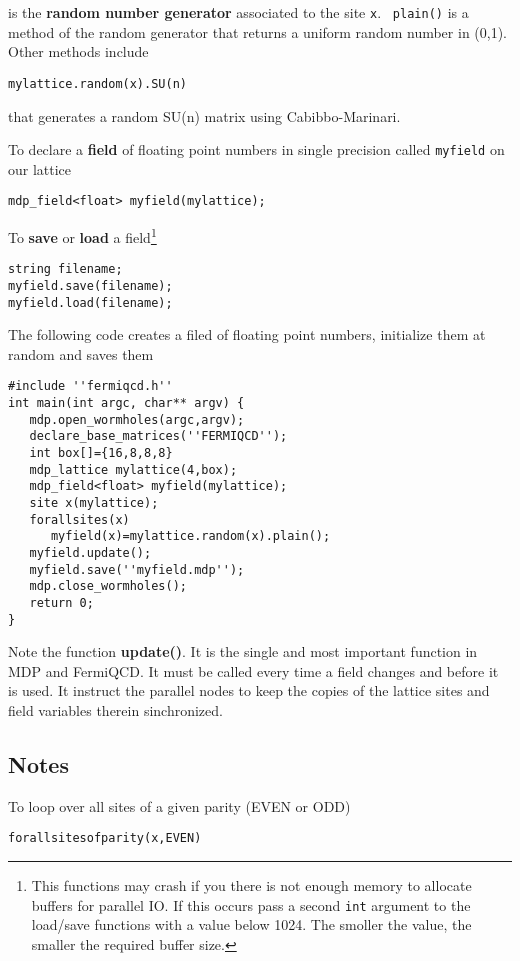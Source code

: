 is the {\bf random number generator} associated to the site {\tt x}. {\tt %
plain()} is a method of the random generator that returns a uniform random
number in (0,1). Other methods include
\begin{verbatim}
mylattice.random(x).SU(n)
\end{verbatim}

that generates a random SU(n) matrix using Cabibbo-Marinari.

To declare a {\bf field} of floating point numbers in single precision
called {\tt myfield} on our lattice
\begin{verbatim}
mdp_field<float> myfield(mylattice);
\end{verbatim}

To {\bf save} or {\bf load} a field\footnote{%
This functions may crash if you there is not enough memory to allocate
buffers for parallel IO. If this occurs pass a second {\tt int} argument to
the load/save functions with a value below 1024. The smoller the value, the
smaller the required buffer size.}
\begin{verbatim}
string filename;
myfield.save(filename);
myfield.load(filename);
\end{verbatim}

The following code creates a filed of floating point numbers, initialize
them at random and saves them
\begin{verbatim}
#include ''fermiqcd.h''
int main(int argc, char** argv) {
   mdp.open_wormholes(argc,argv);
   declare_base_matrices(''FERMIQCD'');
   int box[]={16,8,8,8}
   mdp_lattice mylattice(4,box);
   mdp_field<float> myfield(mylattice);
   site x(mylattice);
   forallsites(x)
      myfield(x)=mylattice.random(x).plain();
   myfield.update();
   myfield.save(''myfield.mdp'');
   mdp.close_wormholes();
   return 0;
}
\end{verbatim}

Note the function {\bf update()}. It is the single and most important
function in MDP and FermiQCD. It must be called every time a field changes
and before it is used. It instruct the parallel nodes to keep the copies of
the lattice sites and field variables therein sinchronized.

\subsection{Notes}

To loop over all sites of a given parity (EVEN or ODD)
\begin{verbatim}
forallsitesofparity(x,EVEN)
\end{verbatim}

